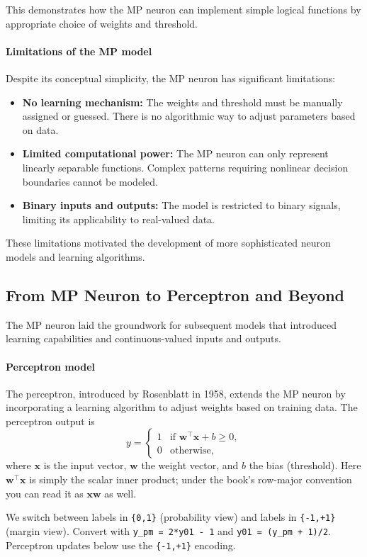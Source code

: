 This demonstrates how the MP neuron can implement simple logical functions by appropriate choice of weights and threshold.

\paragraph{Limitations of the MP model}

Despite its conceptual simplicity, the MP neuron has significant limitations:

\begin{itemize}
    \item \textbf{No learning mechanism:} The weights and threshold must be manually assigned or guessed. There is no algorithmic way to adjust parameters based on data.
    \item \textbf{Limited computational power:} The MP neuron can only represent linearly separable functions. Complex patterns requiring nonlinear decision boundaries cannot be modeled.
    \item \textbf{Binary inputs and outputs:} The model is restricted to binary signals, limiting its applicability to real-valued data.
\end{itemize}

These limitations motivated the development of more sophisticated neuron models and learning algorithms.

\subsection{From MP Neuron to Perceptron and Beyond}
\label{sec:perceptron}

The MP neuron laid the groundwork for subsequent models that introduced learning capabilities and continuous-valued inputs and outputs.

\paragraph{Perceptron model}

The perceptron, introduced by Rosenblatt in 1958, extends the MP neuron by incorporating a learning algorithm to adjust weights based on training data. The perceptron output is
\begin{equation}
    y = \begin{cases}
    1 & \text{if } \mathbf{w}^\top \mathbf{x} + b \geq 0, \\
    0 & \text{otherwise},
    \end{cases}
    \label{eq:perceptron}
\end{equation}
where \(\mathbf{x}\) is the input vector, \(\mathbf{w}\) the weight vector, and \(b\) the bias (threshold). Here \(\mathbf{w}^\top\mathbf{x}\) is simply the scalar inner product; under the book's row\hyp{}major convention you can read it as \(\mathbf{x}\mathbf{w}\) as well.
\begin{tcolorbox}[summarybox, title={Targets and encodings}]
We switch between labels in \texttt{\{0,1\}} (probability view) and labels in \texttt{\{-1,+1\}} (margin view).
Convert with \texttt{y\_pm = 2*y01 - 1} and \texttt{y01 = (y\_pm + 1)/2}.
Perceptron updates below use the \texttt{\{-1,+1\}} encoding.
\end{tcolorbox}

